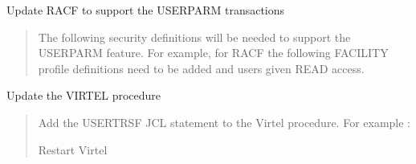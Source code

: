 \documentclass[letterpaper,10pt,english]{sphinxmanual}
\begin{document}
   Update RACF to support the USERPARM transactions
\begin{quote}

\sphinxAtStartPar
The following security definitions will be needed to support the USERPARM feature. For example, for RACF the following FACILITY profile definitions need to be added and users given READ access.

\begin{sphinxVerbatim}[commandchars=\\\{\}]
    
   
    
          
   
    
            
   
    
  
\end{sphinxVerbatim}
\end{quote}

   Update the VIRTEL procedure
\begin{quote}

\sphinxAtStartPar
Add the USERTRSF JCL statement to the Virtel procedure. For example :

\begin{sphinxVerbatim}[commandchars=\\\{\}]
   
\end{sphinxVerbatim}

\sphinxAtStartPar
Restart Virtel
\end{quote}
\end{document}
